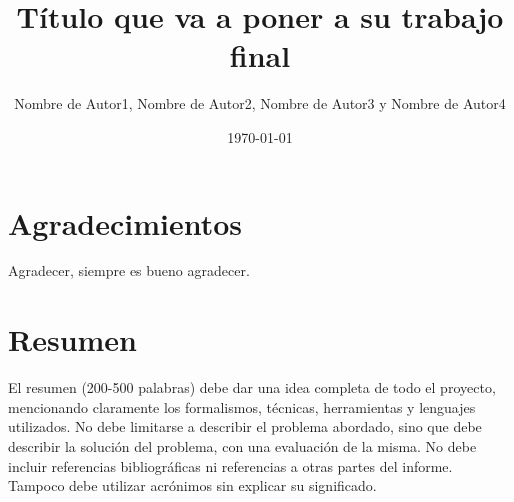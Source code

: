 \documentclass{liccomp}
\title{Título que va a poner a su trabajo final}
\author{Nombre de Autor1, Nombre de Autor2, Nombre de Autor3 y Nombre de Autor4}
\date{\today}
\begin{document}

\frontmatter %

\maketitle



\chapter*{Agradecimientos}

Agradecer, siempre es bueno agradecer.




\chapter*{Resumen}

El resumen (200-500 palabras) debe dar una idea completa de todo el
proyecto, mencionando claramente los formalismos, técnicas, herramientas y lenguajes
utilizados. No debe limitarse a describir el problema abordado, sino que debe describir
la solución del problema, con una evaluación de la misma. No debe incluir referencias
bibliográficas ni referencias a otras partes del informe. Tampoco debe utilizar
acrónimos sin explicar su significado.


\hfill \break
{}


\tableofcontents
\newpage



\mainmatter %
\end{document}
